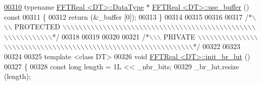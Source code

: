 \begin{DoxyCode}
\hypertarget{a00096_source_l00310}{}\hyperlink{a00010_af1fcd007f1cf0b41bd2188e0b3cd5cca}{00310} \textcolor{keyword}{typename} \hyperlink{a00010_a606148f1cf8c3b7d705473932fc063d1}{FFTReal <DT>::DataType} * \hyperlink{a00010}{FFTReal <DT>::use\_buffer} ()
       \textcolor{keyword}{const}
00311 \{
00312     \textcolor{keywordflow}{return} (&\_buffer [0]);
00313 \}
00314 
00315 
00316 
00317 \textcolor{comment}{/*\(\backslash\)\(\backslash\)\(\backslash\) PROTECTED \(\backslash\)\(\backslash\)\(\backslash\)\(\backslash\)\(\backslash\)\(\backslash\)\(\backslash\)\(\backslash\)\(\backslash\)\(\backslash\)\(\backslash\)\(\backslash\)\(\backslash\)\(\backslash\)\(\backslash\)\(\backslash\)\(\backslash\)\(\backslash\)\(\backslash\)\(\backslash\)\(\backslash\)\(\backslash\)\(\backslash\)\(\backslash\)\(\backslash\)\(\backslash\)\(\backslash\)\(\backslash\)\(\backslash\)\(\backslash\)\(\backslash\)\(\backslash\)\(\backslash\)\(\backslash\)\(\backslash\)\(\backslash\)\(\backslash\)\(\backslash\)\(\backslash\)\(\backslash\)\(\backslash\)\(\backslash\)\(\backslash\)\(\backslash\)\(\backslash\)\(\backslash\)\(\backslash\)\(\backslash\)\(\backslash\)\(\backslash\)\(\backslash\)\(\backslash\)\(\backslash\)\(\backslash\)\(\backslash\)\(\backslash\)\(\backslash\)\(\backslash\)\(\backslash\)\(\backslash\)*/}
00318 
00319 
00320 
00321 \textcolor{comment}{/*\(\backslash\)\(\backslash\)\(\backslash\) PRIVATE \(\backslash\)\(\backslash\)\(\backslash\)\(\backslash\)\(\backslash\)\(\backslash\)\(\backslash\)\(\backslash\)\(\backslash\)\(\backslash\)\(\backslash\)\(\backslash\)\(\backslash\)\(\backslash\)\(\backslash\)\(\backslash\)\(\backslash\)\(\backslash\)\(\backslash\)\(\backslash\)\(\backslash\)\(\backslash\)\(\backslash\)\(\backslash\)\(\backslash\)\(\backslash\)\(\backslash\)\(\backslash\)\(\backslash\)\(\backslash\)\(\backslash\)\(\backslash\)\(\backslash\)\(\backslash\)\(\backslash\)\(\backslash\)\(\backslash\)\(\backslash\)\(\backslash\)\(\backslash\)\(\backslash\)\(\backslash\)\(\backslash\)\(\backslash\)\(\backslash\)\(\backslash\)\(\backslash\)\(\backslash\)\(\backslash\)\(\backslash\)\(\backslash\)\(\backslash\)\(\backslash\)\(\backslash\)\(\backslash\)\(\backslash\)\(\backslash\)\(\backslash\)\(\backslash\)\(\backslash\)\(\backslash\)\(\backslash\)*/}
00322 
00323 
00324 
00325 \textcolor{keyword}{template} <\textcolor{keyword}{class} DT>
00326 \textcolor{keywordtype}{void}    \hyperlink{a00010}{FFTReal <DT>::init\_br\_lut} ()
00327 \{
00328     \textcolor{keyword}{const} \textcolor{keywordtype}{long}      length = 1L << \_nbr\_bits;
00329     \_br\_lut.resize (length);

\end{DoxyCode}
